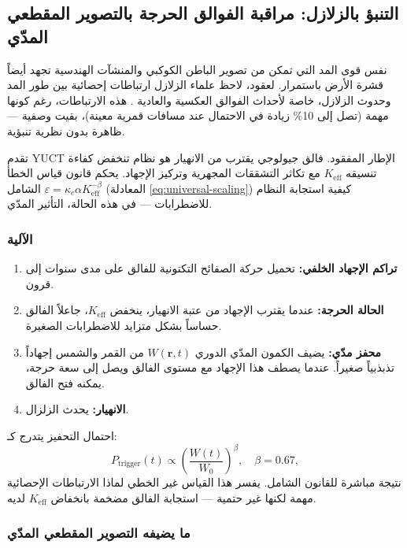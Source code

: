 \documentclass[12pt,a4paper]{article}
\theoremstyle{remark}
\begin{document}
	\subsection{التنبؤ بالزلازل: مراقبة الفوالق الحرجة بالتصوير المقطعي المدّي}
	\label{sec:earthquakes}
	
	نفس قوى المد التي تمكن من تصوير الباطن الكوكبي والمنشآت الهندسية تجهد أيضاً قشرة الأرض باستمرار. لعقود، لاحظ علماء الزلازل ارتباطات إحصائية بين طور المد وحدوث الزلازل، خاصة لأحداث الفوالق العكسية والعادية \cite{Tanaka2012, Tolstoy2013, Sibgatulin2014, RAN2025}. هذه الارتباطات، رغم كونها مهمة (تصل إلى 10\% زيادة في الاحتمال عند مسافات قمرية معينة)، بقيت وصفية — ظاهرة بدون نظرية تنبؤية.
	
	تقدم YUCT الإطار المفقود. فالق جيولوجي يقترب من الانهيار هو نظام تنخفض كفاءة تنسيقه \(K_{\mathrm{eff}}\) مع تكاثر التشققات المجهرية وتركيز الإجهاد. يحكم قانون قياس الخطأ الشامل \(\varepsilon = \kappa_c \alpha K_{\mathrm{eff}}^{-\beta}\) (المعادلة \ref{eq:universal-scaling}) كيفية استجابة النظام للاضطرابات — في هذه الحالة، التأثير المدّي.
	
	\subsubsection{الآلية}
	
	\begin{enumerate}
		\item \textbf{تراكم الإجهاد الخلفي:} تحميل حركة الصفائح التكتونية للفالق على مدى سنوات إلى قرون.
		\item \textbf{الحالة الحرجة:} عندما يقترب الإجهاد من عتبة الانهيار، ينخفض \(K_{\mathrm{eff}}\)، جاعلاً الفالق حساساً بشكل متزايد للاضطرابات الصغيرة.
		\item \textbf{محفز مدّي:} يضيف الكمون المدّي الدوري \(W(\mathbf{r},t)\) من القمر والشمس إجهاداً تذبذبياً صغيراً. عندما يصطف هذا الإجهاد مع مستوى الفالق ويصل إلى سعة حرجة، يمكنه فتح الفالق.
		\item \textbf{الانهيار:} يحدث الزلزال.
	\end{enumerate}
	
	احتمال التحفيز يتدرج كـ:
	\[
	P_{\text{trigger}}(t) \propto \left( \frac{W(t)}{W_0} \right)^{\beta}, \quad \beta = 0.67,
	\]
	نتيجة مباشرة للقانون الشامل. يفسر هذا القياس غير الخطي لماذا الارتباطات الإحصائية مهمة لكنها غير حتمية — استجابة الفالق مضخمة بانخفاض \(K_{\mathrm{eff}}\) لديه.
	
	\subsubsection{ما يضيفه التصوير المقطعي المدّي}
	
\end{document}
